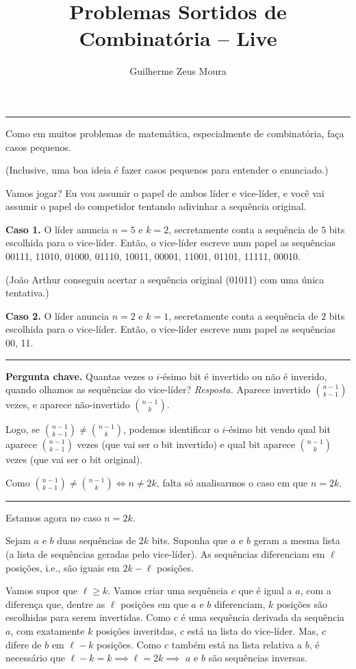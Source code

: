 \documentclass[10pt, a4paper]{article}
\title{Problemas Sortidos de Combinatória -- Live}
\author{Guilherme Zeus Moura}
\newcommand{\sep}{
	
	\begin{center}
		\vspace{-.6em}
		\rule{10cm}{.5pt}
		\vspace{-.3em}
	\end{center}

}
\begin{document}
	
	\zeustitle


	\sep

	\begin{hnt}
		Como em muitos problemas de matemática, especialmente de combinatória, faça casos pequenos.
		
		(Inclusive, uma boa ideia é fazer casos pequenos para entender o enunciado.)
	\end{hnt}

	Vamos jogar? Eu vou assumir o papel de ambos líder e vice-líder, e você vai assumir o papel do competidor tentando adivinhar a sequência original.

	\textbf{Caso 1.} O líder anuncia $n=5$ e $k=2$, secretamente conta a sequência de $5$ bits escolhida para o vice-líder. Então, o vice-líder escreve num papel as sequências 00111, 11010, 01000, 01110, 10011, 00001, 11001, 01101, 11111, 00010.
	
	(João Arthur conseguiu acertar a sequência original (01011) com uma única tentativa.)

	\textbf{Caso 2.} O líder anuncia $n=2$ e $k=1$, secretamente conta a sequência de $2$ bits escolhida para o vice-líder. Então, o vice-líder escreve num papel as sequências 00, 11.

	\sep

	\textbf{Pergunta chave.} Quantas vezes o $i$-ésimo bit é invertido ou não é inverido, quando olhamos as sequências do vice-líder?
	\textit{Resposta.} Aparece invertido $\binom{n-1}{k-1}$ vezes, e aparece não-invertido $\binom{n-1}{k}$.

	Logo, se $\binom{n-1}{k-1} \neq \binom{n-1}{k}$, podemos identificar o $i$-ésimo bit vendo qual bit aparece $\binom{n-1}{k-1}$ vezes (que vai ser o bit invertido) e qual bit aparece $\binom{n-1}{k}$ vezes (que vai ser o bit original). 

	Como $\binom{n-1}{k-1} \neq \binom{n-1}{k} \iff n \neq 2k$, falta só analisarmos o caso em que $n = 2k$.

	\sep

	Estamos agora no caso $n = 2k$.
	
	Sejam $a$ e $b$ duas sequências de $2k$ bits. Suponha que $a$ e $b$ geram a mesma lista (a lista de sequências geradas pelo vice-líder). As sequências diferenciam em $\ell$ posições, i.e., são iguais em $2k - \ell$ posições.
	
	Vamos supor que $\ell \ge k$. Vamos criar uma sequência $c$ que é igual a $a$, com a diferença que, dentre as $\ell$ posições em que $a$ e $b$ diferenciam, $k$ posições são escolhidas para serem invertidas. Como $c$ é uma sequência derivada da sequência $a$, com exatamente $k$ posições inveritdas, $c$ está na lista do vice-líder. Mas, $c$ difere de $b$ em $\ell - k$ posições. Como $c$ também está na lista relativa a $b$, é necessário que $\ell - k = k \implies \ell = 2k \implies$ $a$ e $b$ são sequências inversas.
\end{document}
